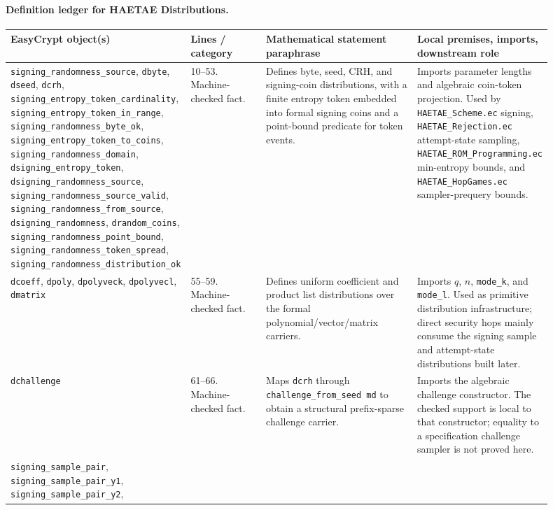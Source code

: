 \documentclass[11pt]{report}
\DeclareRobustCommand{\file}[1]{\ifmmode\text{\nolinkurl{#1}}\else\nolinkurl{#1}\fi}
\DeclareRobustCommand{\ec}[1]{\ifmmode\text{\nolinkurl{#1}}\else\nolinkurl{#1}\fi}
\theoremstyle{definition}
\theoremstyle{plain}
\begin{document}
\paragraph{Definition ledger for HAETAE Distributions.}
{\footnotesize
\begin{longtable}{p{0.25\linewidth}p{0.14\linewidth}p{0.28\linewidth}p{0.23\linewidth}}
\toprule
\textbf{EasyCrypt object(s)} & \textbf{Lines / category} &
\textbf{Mathematical statement paraphrase} &
\textbf{Local premises, imports, downstream role} \\
\midrule
\ec{signing\_randomness\_source}, \ec{dbyte}, \ec{dseed}, \ec{dcrh},
\ec{signing\_entropy\_token\_cardinality},
\ec{signing\_entropy\_token\_in\_range},
\ec{signing\_randomness\_byte\_ok},
\ec{signing\_entropy\_token\_to\_coins},
\ec{signing\_randomness\_domain}, \ec{dsigning\_entropy\_token},
\ec{dsigning\_randomness\_source},
\ec{signing\_randomness\_source\_valid},
\ec{signing\_randomness\_from\_source},
\ec{dsigning\_randomness}, \ec{drandom\_coins},
\ec{signing\_randomness\_point\_bound},
\ec{signing\_randomness\_token\_spread},
\ec{signing\_randomness\_distribution\_ok} &
10--53. Machine-checked fact. &
Defines byte, seed, CRH, and signing-coin distributions, with a finite entropy
token embedded into formal signing coins and a point-bound predicate for token
events. &
Imports parameter lengths and algebraic coin-token projection.  Used by
\file{HAETAE\_Scheme.ec} signing, \file{HAETAE\_Rejection.ec} attempt-state
sampling, \file{HAETAE\_ROM\_Programming.ec} min-entropy bounds, and
\file{HAETAE\_HopGames.ec} sampler-prequery bounds. \\
\midrule
\ec{dcoeff}, \ec{dpoly}, \ec{dpolyveck}, \ec{dpolyvecl}, \ec{dmatrix} &
55--59. Machine-checked fact. &
Defines uniform coefficient and product list distributions over the formal
polynomial/vector/matrix carriers. &
Imports \(q\), \(n\), \ec{mode\_k}, and \ec{mode\_l}.  Used as primitive
distribution infrastructure; direct security hops mainly consume the signing
sample and attempt-state distributions built later. \\
\midrule
\ec{dchallenge} &
61--66. Machine-checked fact. &
Maps \ec{dcrh} through \ec{challenge\_from\_seed md} to obtain a structural
prefix-sparse challenge carrier. &
Imports the algebraic challenge constructor.  The checked support is local to
that constructor; equality to a specification challenge sampler is not proved
here. \\
\midrule
\ec{signing\_sample\_pair},
\ec{signing\_sample\_pair\_y1},
\ec{signing\_sample\_pair\_y2},

\end{longtable}}
\end{document}
